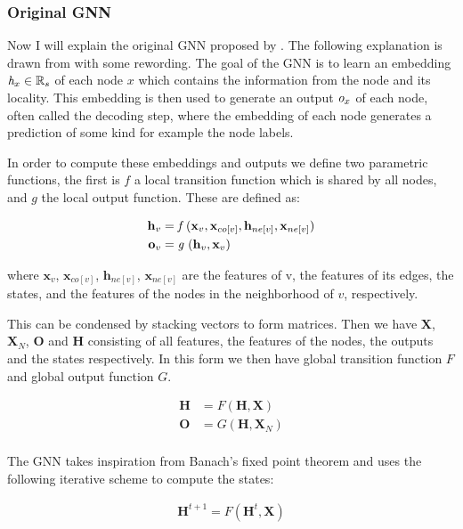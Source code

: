 \documentclass[]{../resources/final_report}
\newcommand{\Reals}{\mathbb{R}}
\begin{document}
\subsubsection{Original GNN}
Now I will explain the original GNN proposed by \cite{GNN}. The following explanation is drawn from \cite{graphoverview} with some rewording. 
The goal of the GNN is to learn an embedding $ \emph{h}_x \in \Reals_s $ of each node $x$ which contains the information 
from the node and its locality. This embedding is then used to generate an output $\emph{o}_x$ of each node, often called the decoding step,
where the embedding of each node generates a prediction of some kind for example the node labels.

In order to compute these embeddings and outputs we define two parametric functions, the first is $f$ a 
local transition function which is shared by all nodes, and $g$ the local output function. These are defined as:

\begin{align}
  \textbf{h}_v &= \emph{f }(\textbf{x}_v, \textbf{x}_{co[v]}, \textbf{h}_{ne[v]}, \textbf{x}_{ne[v]})\\
  \textbf{o}_v &= \emph{g }(\textbf{h}_v, \textbf{x}_v)
\end{align}

where $\textbf{x}_v$, $\textbf{x}_{co[v]}$, $\textbf{h}_{ne[v]}$, $\textbf{x}_{ne[v]}$ are the features of v, the features of its edges, 
the states, and the features of the nodes in the neighborhood of $v$, respectively.

This can be condensed by stacking vectors to form matrices. Then we have $\textbf{X}$, $\textbf{X}_N$, $\textbf{O}$ and $\textbf{H}$ 
consisting of all features, the features of the nodes, the outputs and the states respectively. In this form we then have global transition 
function $F$ and global output function $G$.

\begin{align}
  \textbf{H} &= F(\textbf{H}, \textbf{X})\\
  \textbf{O} &= G(\textbf{H}, \textbf{X}_N)\\
\end{align}

The GNN takes inspiration from Banach's fixed point theorem \cite{khamsi_kirk_2011} and uses the following iterative scheme to 
compute the states:

\begin{align}
  \textbf{H}^{t+1} = F(\textbf{H}^t, \textbf{X})
\end{align}
\end{document}
